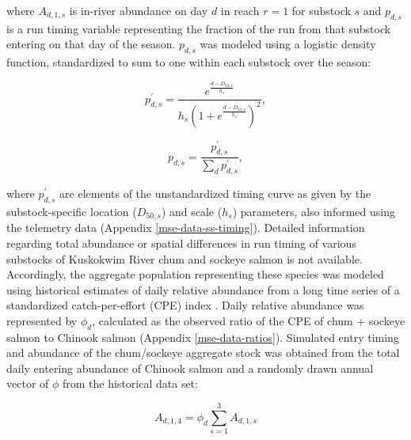 \documentclass[12pt,]{book}
\theoremstyle{definition}
\theoremstyle{definition}
\theoremstyle{definition}
\theoremstyle{remark}
\begin{document}
\noindent
where \(A_{d,1,s}\) is in-river abundance on day \(d\) in reach
\(r = 1\) for substock \(s\) and \(p_{d,s}\) is a run timing variable
representing the fraction of the run from that substock entering on that
day of the season. \(p_{d,s}\) was modeled using a logistic density
function, standardized to sum to one within each substock over the
season:

\begin{equation}
  p^{\prime}_{d,s} = \frac{e^{\frac{d-D_{50,s}}{h_s}}}{h_s \left(1 + e^{\frac{d-D_{50,s}}{h_s}} \right)^2},
  \label{eq:get-p-prime}
\end{equation}

\begin{equation}
  p_{d,s}=\frac{p^{\prime}_{d,s}}{\sum_d p^{\prime}_{d,s}},
  \label{eq:get-p}
\end{equation}

\noindent
where \(p^{\prime}_{d,s}\) are elements of the unstandardized timing
curve as given by the substock-specific location (\(D_{50,s}\)) and
scale (\(h_s\)) parameters, also informed using the telemetry data
(Appendix \ref{mse-data-ss-timing}). Detailed information regarding
total abundance or spatial differences in run timing of various
substocks of Kuskokwim River chum and sockeye salmon is not available.
Accordingly, the aggregate population representing these species was
modeled using historical estimates of daily relative abundance from a
long time series of a standardized catch-per-effort (CPE) index
\citep[the Bethel Test Fishery -- BTF;][]{bue-lipka-2016}. Daily
relative abundance was represented by \(\phi_d\), calculated as the
observed ratio of the CPE of chum + sockeye salmon to Chinook salmon
(Appendix \ref{mse-data-ratios}). Simulated entry timing and abundance
of the chum/sockeye aggregate stock was obtained from the total daily
entering abundance of Chinook salmon and a randomly drawn annual vector
of \(\phi\) from the historical data set:

\begin{equation}
  A_{d,1,4}=\phi_d \sum_{s=1}^3 A_{d,1,s}
  \label{eq:get-chsk-entry}
\end{equation}
\end{document}
